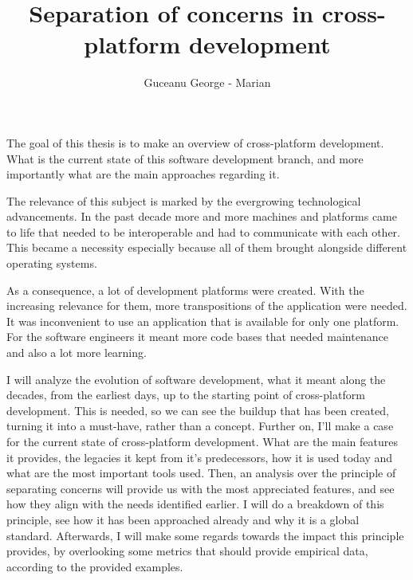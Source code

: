 \documentclass[12pt]{report}
\begin{document}
\title{Separation of concerns in cross-platform development}					   
\author{Guceanu George - Marian}											
				
\maketitle


\newpage
\thispagestyle{empty}
\mbox{}
\newpage
{} 

\cleardoublepage


\par
The goal of this thesis is to make an overview of cross-platform development. 
What is the current state of this software development branch, and more importantly what are the main approaches regarding it.
\par
The relevance of this subject is marked by the evergrowing technological advancements.
In the past decade more and more machines and platforms came to life that needed to be interoperable and had to communicate with each other.
This became a necessity especially because all of them brought alongside different operating systems.
\par 
As a consequence, a lot of development platforms were created.
With the increasing relevance for them, more transpositions of the application were needed.
It was inconvenient to use an application that is available for only one platform.
For the software engineers it meant more code bases that needed maintenance and also a lot more learning.
\par
I will analyze the evolution of software development, what it meant along the decades, from the earliest days, up to the starting point of cross-platform development.
This is needed, so we can see the buildup that has been created, turning it into a must-have, rather than a concept.
Further on, I'll make a case for the current state of cross-platform development.
What are the main features it provides, the legacies it kept from it's predecessors, how it is used today and what are the most important tools used.
Then, an analysis over the principle of separating concerns will provide us with the most appreciated features, and see how they align with the needs identified earlier.
I will do a breakdown of this principle, see how it has been approached already and why it is a global standard.
Afterwards, I will make some regards towards the impact this principle provides, by overlooking some metrics that should provide empirical data, according to the provided examples.
\end{document}
